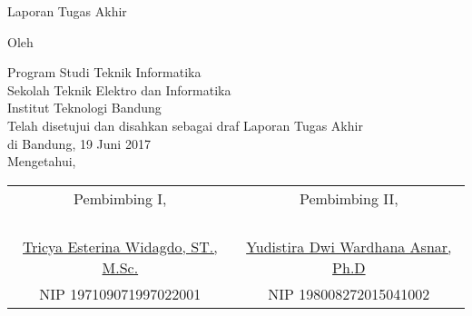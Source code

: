 \clearpage
\pagestyle{empty}

\begin{center}
\smallskip

    \Large \bfseries \MakeUppercase{\thetitle}
    \vfill

    \Large Laporan Tugas Akhir
    \vfill

    \large Oleh

    \Large \theauthor

    \large Program Studi Teknik Informatika \\
    \normalsize \normalfont
    Sekolah Teknik Elektro dan Informatika \\
    Institut Teknologi Bandung \\

    \vfill
    \normalsize \normalfont
    Telah disetujui dan disahkan sebagai draf Laporan Tugas Akhir \\ di Bandung, 19 Juni 2017 \\
    Mengetahui,

    \vfill
    \setlength{\tabcolsep}{12pt}
    \begin{tabular}{c@{\hskip 0.5in}c}
        Pembimbing I, & Pembimbing II, \\
        & \\
        & \\
        & \\
        & \\
        \underline{Tricya Esterina Widagdo, ST., M.Sc.} & \underline{Yudistira Dwi Wardhana Asnar, Ph.D} \\
        NIP 197109071997022001 & NIP 198008272015041002 \\
    \end{tabular}

\end{center}
\clearpage

